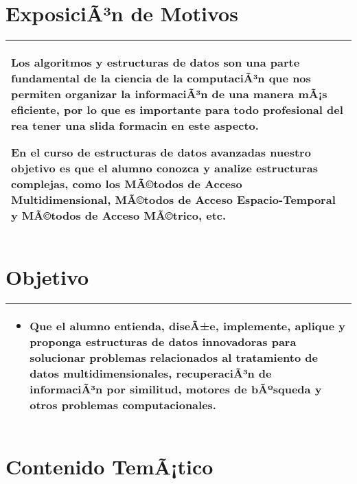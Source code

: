 \documentclass[a4paper]{article}
\begin{document}
\bigskip

\section{ExposiciÃ³n de Motivos}
\begin{tabularx}{\textwidth}{|X|}\hline
Los algoritmos y estructuras de datos son una parte fundamental de la ciencia de la computaciÃ³n que nos permiten organizar la informaciÃ³n de una manera mÃ¡s eficiente, por lo que es importante para todo profesional del  rea tener una s lida formaci n en este aspecto.

En el curso de estructuras de datos avanzadas nuestro objetivo es que el alumno conozca y analize estructuras complejas, como los MÃ©todos de Acceso Multidimensional, MÃ©todos de Acceso Espacio-Temporal y MÃ©todos de Acceso MÃ©trico, etc.

\\ \hline
\end{tabularx}

\section{Objetivo}
\begin{tabularx}{\textwidth}{|X|} \hline
\begin{itemize}
\item Que el alumno entienda, diseÃ±e, implemente, aplique y
proponga estructuras de datos innovadoras para solucionar
problemas relacionados al tratamiento de datos multidimensionales,
recuperaciÃ³n de informaciÃ³n por similitud, motores de bÃºsqueda y
otros problemas computacionales.

\end{itemize} 
\\ \hline
\end{tabularx}

\section{Contenido TemÃ¡tico}
\end{document}
